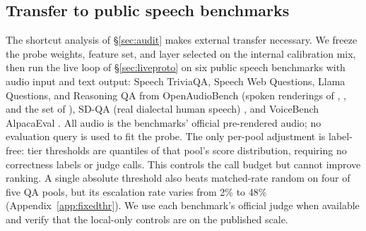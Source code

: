 \subsection{Transfer to public speech benchmarks}
\label{sec:transfer}
\label{sec:transfer-neg}

The shortcut analysis of \S\ref{sec:audit} makes external transfer
necessary. We freeze the
probe weights, feature set, and layer selected on the internal
calibration mix, then run the live loop of \S\ref{sec:liveproto} on six
public speech benchmarks with audio input and text output: Speech
TriviaQA, Speech Web Questions, Llama Questions, and Reasoning QA from
OpenAudioBench \citep{openaudiobench2025} (spoken renderings of
\citealp{joshi2017triviaqa}, \citealp{berant2013webquestions}, and the
set of \citealp{nachmani2024spoken}), SD-QA (real dialectal human
speech) \citep{faisal2021sdqa}, and VoiceBench AlpacaEval
\citep{chen2024voicebench,taori2023alpaca}. All audio is the
benchmarks' official pre-rendered audio; no evaluation query is used to
fit the probe. The only per-pool adjustment is label-free: tier
thresholds are quantiles of that pool's score distribution, requiring
no correctness labels or judge calls. This controls the call budget but
cannot improve ranking. A single absolute threshold also beats
matched-rate random on four of five QA pools, but its escalation rate
varies from 2\% to 48\% (Appendix~\ref{app:fixedthr}). We use each benchmark's
official judge when available and verify that the local-only controls
are on the published scale.

